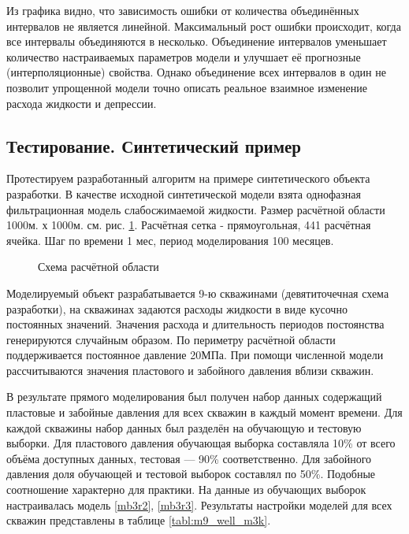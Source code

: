 \documentclass[14pt]{article}
\begin{document}
Из графика видно, что зависимость ошибки от количества объединённых интервалов не является линейной. Максимальный рост ошибки происходит, когда все интервалы объединяются в несколько.
Объединение интервалов уменьшает количество настраиваемых параметров модели и улучшает её прогнозные (интерполяционные) свойства. Однако объединение всех интервалов в один не позволит упрощенной модели точно описать реальное взаимное изменение расхода жидкости и депрессии. 

\subsection{Тестирование. Синтетический пример}
Протестируем разработанный алгоритм на примере синтетического объекта разработки. В качестве исходной синтетической модели взята однофазная фильтрационная модель слабосжимаемой жидкости. Размер расчётной области 1000м. х 1000м. см. рис. \ref{fig:map9}. Расчётная сетка - прямоугольная, 441 расчётная ячейка. Шаг по времени 1 мес, период моделирования 100 месяцев.
\begin{figure}[!htb]
	\caption{Схема расчётной области}
	\label{fig:map9}
\end{figure}
Моделируемый объект разрабатывается 9-ю скважинами (девятиточечная схема разработки), на скважинах задаются расходы жидкости в виде кусочно постоянных значений. Значения расхода и длительность периодов постоянства генерируются случайным образом. По периметру расчётной области поддерживается постоянное давление 20МПа. При помощи численной модели рассчитываются значения пластового и забойного давления вблизи скважин. 

В результате прямого моделирования был получен набор данных содержащий пластовые и забойные давления для всех скважин в каждый момент времени. Для каждой скважины набор данных был разделён на обучающую и тестовую выборки. Для пластового давления обучающая выборка составляла 10\% от всего объёма доступных данных, тестовая --- 90\% соответственно. Для забойного давления доля обучающей и тестовой выборок составлял по 50\%. Подобные соотношение характерно для практики.
На данные из обучающих выборок настраивалась модель \ref{mb3r2}, \ref{mb3r3}. Результаты настройки моделей для всех скважин представлены в таблице \ref{tabl:m9_well_m3k}. 
\end{document}
